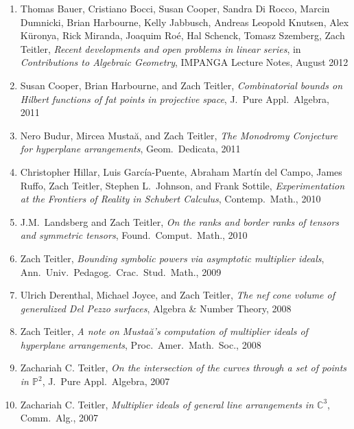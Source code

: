 \documentclass[12pt]{article}
\begin{document}
\begin{enumerate}[revarabic,labelwidth=*]
\item
Thomas Bauer, Cristiano Bocci, Susan Cooper, Sandra Di Rocco, Marcin Dumnicki, Brian Harbourne, Kelly Jabbusch, Andreas Leopold Knutsen, Alex K\"uronya,
Rick Miranda, Joaquim Ro\'e, Hal Schenck, Tomasz Szemberg, Zach Teitler,
\emph{Recent developments and open problems in linear series},
in \textit{Contributions to Algebraic Geometry}, IMPANGA Lecture Notes, August 2012

\item Susan Cooper, Brian Harbourne, and Zach Teitler,
\emph{Combinatorial bounds on Hilbert functions of fat points in projective space},
J.\ Pure Appl.\ Algebra,
2011

\item
Nero Budur, Mircea Musta\u{a}, and Zach Teitler,
\emph{The Monodromy Conjecture for hyperplane arrangements},
Geom.\ Dedicata,
2011

\item
Christopher Hillar, Luis Garc\'ia-Puente, Abraham Mart\'in del Campo, James Ruffo, Zach Teitler,
Stephen L.\ Johnson, and Frank Sottile,
\emph{Experimentation at the Frontiers of Reality in Schubert Calculus},
Contemp.\ Math.,
2010

\item J.M.~Landsberg and Zach Teitler,
\emph{On the ranks and border ranks of tensors and symmetric tensors},
Found.\ Comput.\ Math.,
2010

\item Zach Teitler,
\emph{Bounding symbolic powers via asymptotic multiplier ideals},
Ann.\ Univ.\ Pedagog.\ Crac.\ Stud.\ Math.,
2009

\item Ulrich Derenthal, Michael Joyce, and Zach Teitler,
\emph{The nef cone volume of generalized Del Pezzo surfaces},
Algebra \& Number Theory,
2008

\item Zach Teitler,
\emph{A note on Musta\u{a}'s computation of multiplier ideals of hyperplane arrangements},
Proc.\ Amer.\ Math.\ Soc.,
2008

\item Zachariah C. Teitler,
\emph{On the intersection of the curves through a set of points in $\mathbb{P}^2$},
J.\ Pure Appl.\ Algebra,
2007

\item Zachariah C. Teitler,
\emph{Multiplier ideals of general line arrangements in $\mathbb{C}^3$},
Comm.\ Alg.,
2007

\end{enumerate}
\end{document}
